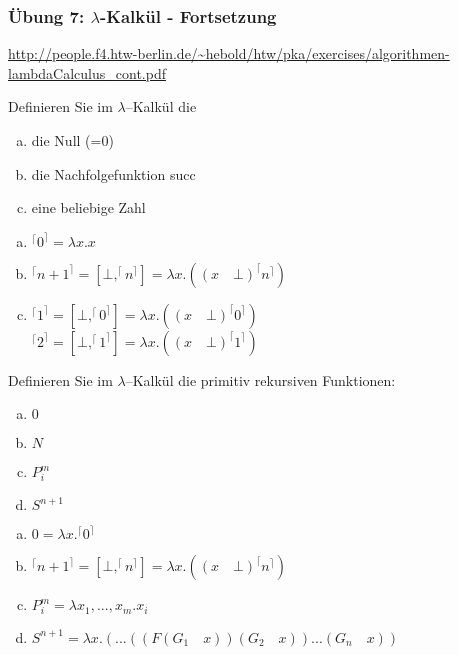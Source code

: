 \begin{card}
	\frametitle{Übung 7: $\lambda$-Kalkül - Fortsetzung}
	\url{http://people.f4.htw-berlin.de/~hebold/htw/pka/exercises/algorithmen-lambdaCalculus_cont.pdf}
\end{card}

\begin{card}
	Definieren Sie im $\lambda$–Kalkül die
	\begin{enumerate}[a)]
    \item die Null (=0)
    \item die Nachfolgefunktion succ
    \item eine beliebige Zahl
	\end{enumerate}
	\hr
	\begin{enumerate}[a)]
    \item $^\lceil 0 ^\rceil = \lambda x.x$
    \item $^\lceil n+1 ^\rceil = [\bot, ^\lceil n ^\rceil] = \lambda x.((x \quad \bot) ^\lceil n ^\rceil)$
    \item $^\lceil 1 ^\rceil = [\bot, ^\lceil 0 ^\rceil] = \lambda x.((x \quad \bot) ^\lceil 0 ^\rceil)$\\
        $^\lceil 2 ^\rceil = [\bot, ^\lceil 1 ^\rceil] = \lambda x.((x \quad \bot) ^\lceil 1 ^\rceil)$
	\end{enumerate}
\end{card}

\begin{card}
	Definieren Sie im $\lambda$–Kalkül die primitiv rekursiven Funktionen:
	\begin{enumerate}[a)]
    \item $0$
    \item $N$
    \item $P^m_i$
    \item $S^{n+1}$
	\end{enumerate}
	\hr
	\begin{enumerate}[a)]
    \item $0 = \lambda x.^\lceil 0 ^\rceil$
    \item $^\lceil n+1 ^\rceil = [\bot, ^\lceil n ^\rceil] = \lambda x.((x \quad \bot) ^\lceil n ^\rceil)$\\
    \item $P^m_i = \lambda x_1,...,x_m.x_i$
    \item $S^{n+1} = \lambda x.(...((F (G_1 \quad x)) (G_2 \quad x)) ... (G_n \quad x))$
	\end{enumerate}
\end{card}

